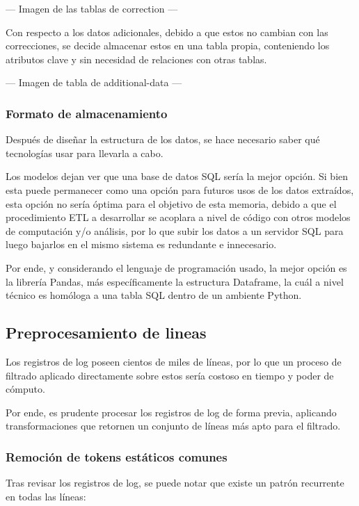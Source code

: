 --- Imagen de las tablas de correction ---

Con respecto a los datos adicionales, debido a que estos no cambian con las correcciones, se decide almacenar estos en una tabla propia, conteniendo los atributos clave y sin necesidad de relaciones con otras tablas.

--- Imagen de tabla de additional-data ---

\subsubsection{Formato de almacenamiento}

Después de diseñar la estructura de los datos, se hace necesario saber qué tecnologías usar para llevarla a cabo.

Los modelos dejan ver que una base de datos SQL sería la mejor opción. Si bien esta puede permanecer como una opción para futuros usos de los datos extraídos, esta opción no sería óptima para el objetivo de esta memoria, debido a que el procedimiento ETL a desarrollar se acoplara a nivel de código con otros modelos de computación y/o análisis, por lo que subir los datos a un servidor SQL para luego bajarlos en el mismo sistema es redundante e innecesario.

Por ende, y considerando el lenguaje de programación usado, la mejor opción es la librería Pandas, más específicamente la estructura Dataframe, la cuál a nivel técnico es homóloga a una tabla SQL dentro de un ambiente Python.

\subsection{Preprocesamiento de lineas}

Los registros de log poseen cientos de miles de líneas, por lo que un proceso de filtrado aplicado directamente sobre estos sería costoso en tiempo y poder de cómputo.

Por ende, es prudente procesar los registros de log de forma previa, aplicando transformaciones que retornen un conjunto de líneas más apto para el filtrado.

\subsubsection{Remoción de tokens estáticos comunes}

Tras revisar los registros de log, se puede notar que existe un patrón recurrente en todas las líneas:

